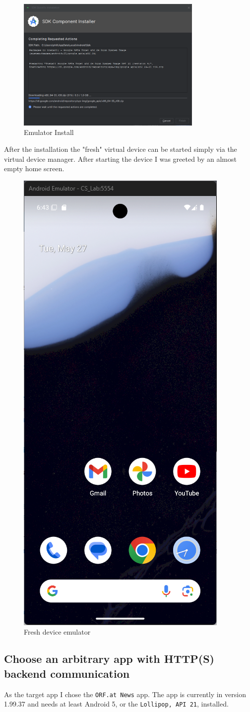 \documentclass[12pt,a4paper]{article}
\begin{document}
\begin{figure}[H]
\centering
\includegraphics[width=0.8\textwidth]{./screenshots/android_em_install.png}
\caption{Emulator Install}
\end{figure}

After the installation the "fresh" virtual device can be started simply via the virtual device manager. After starting the device I was greeted by an almost empty home screen.

\begin{figure}[H]
\centering
\includegraphics[width=.25\textwidth]{./screenshots/fresh_virtual_dev.png}
\caption{Fresh device emulator}
\end{figure}

\clearpage

\subsection{Choose an arbitrary app with HTTP(S) backend communication}

As the target app I chose the \texttt{ORF.at News} app. The app is currently in version 1.99.37 and needs at least Android 5, or the \texttt{Lollipop, API 21}, installed.
\end{document}
